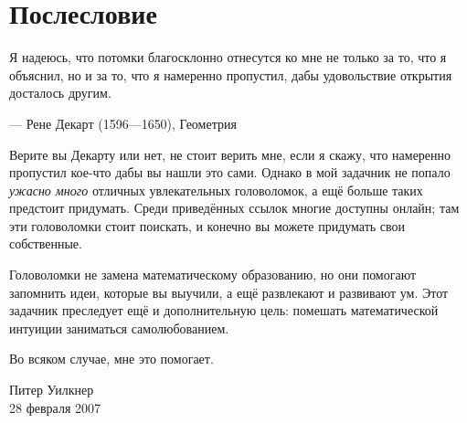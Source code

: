 \chapter{Послесловие}


\setlength{\epigraphwidth}{.83\textwidth}
\epigraph{Я надеюсь, что потомки благосклонно отнесутся ко мне не только за то, что я объяснил, но и за то, что я намеренно пропустил, дабы удовольствие открытия досталось другим.}{--- Рене Декарт (1596---1650), Геометрия}


Верите вы Декарту или нет, не стоит верить мне, если я скажу, что намеренно пропустил кое-что дабы вы нашли это сами.
Однако в мой задачник не попало \emph{ужасно много} отличных увлекательных головоломок, а ещё больше таких предстоит придумать.
Среди приведённых ссылок многие доступны онлайн; там эти головоломки стоит поискать,
и конечно вы можете придумать свои собственные.

Головоломки не замена математическому образованию, но они помогают запомнить идеи, которые вы выучили, а ещё развлекают и развивают ум.
Этот задачник преследует ещё и дополнительную цель:
помешать математической интуиции заниматься самолюбованием.

Во всяком случае, мне это помогает.

\begin{flushright}
Питер Уилкнер\\
28 февраля 2007
\end{flushright}
